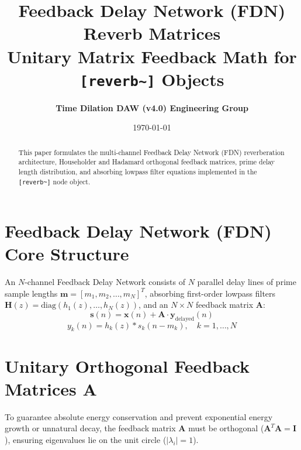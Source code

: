 \documentclass[11pt,a4paper]{article}
\title{\textbf{\Huge Feedback Delay Network (FDN) Reverb Matrices}\\[0.5em]
\Large Unitary Matrix Feedback Math for \texttt{[reverb\textasciitilde{}]} Objects}
\author{\textbf{Time Dilation DAW (v4.0) Engineering Group}}
\date{\today}
\begin{document}
\maketitle

\begin{abstract}
This paper formulates the multi-channel Feedback Delay Network (FDN) reverberation architecture, Householder and Hadamard orthogonal feedback matrices, prime delay length distribution, and absorbing lowpass filter equations implemented in the \texttt{[reverb\textasciitilde{}]} node object.
\end{abstract}

\section{Feedback Delay Network (FDN) Core Structure}
An $N$-channel Feedback Delay Network consists of $N$ parallel delay lines of prime sample lengths $\mathbf{m} = [m_1, m_2, \dots, m_N]^T$, absorbing first-order lowpass filters $\mathbf{H}(z) = \text{diag}(h_1(z), \dots, h_N(z))$, and an $N \times N$ feedback matrix $\mathbf{A}$:
\begin{equation}
\mathbf{s}(n) = \mathbf{x}(n) + \mathbf{A} \cdot \mathbf{y}_{\text{delayed}}(n)
\end{equation}
\begin{equation}
y_k(n) = h_k(z) * s_k(n - m_k), \quad k = 1, \dots, N
\end{equation}

\section{Unitary Orthogonal Feedback Matrices $\mathbf{A}$}
To guarantee absolute energy conservation and prevent exponential energy growth or unnatural decay, the feedback matrix $\mathbf{A}$ must be orthogonal ($\mathbf{A}^T \mathbf{A} = \mathbf{I}$), ensuring eigenvalues lie on the unit circle ($|\lambda_i| = 1$).
\end{document}
